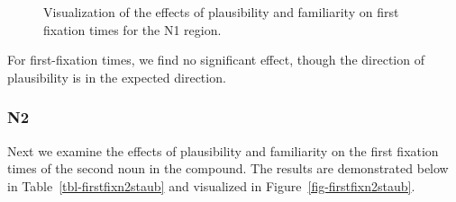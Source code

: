 \documentclass[
  letterpaper,
  DIV=11,
  numbers=noendperiod,
  nottoc]{scrreprt}
\begin{document}
\begin{figure}[htbp]


\caption{\label{fig-firstfixn1staub}Visualization of the effects of
plausibility and familiarity on first fixation times for the N1 region.}

\end{figure}%

For first-fixation times, we find no significant effect, though the
direction of plausibility is in the expected direction.

\subsubsection{N2}\label{n2-4}

Next we examine the effects of plausibility and familiarity on the first
fixation times of the second noun in the compound. The results are
demonstrated below in Table~\ref{tbl-firstfixn2staub} and visualized in
Figure~\ref{fig-firstfixn2staub}.
\end{document}
